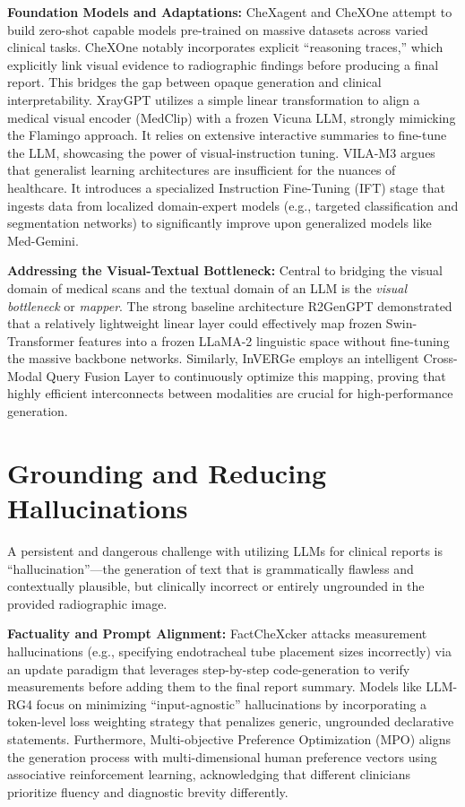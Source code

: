 \documentclass[11pt]{article}
\begin{document}
\textbf{Foundation Models and Adaptations:}
CheXagent \cite{chen2024chexagent} and CheXOne \cite{zhou2026chexone} attempt to build zero-shot capable models pre-trained on massive datasets across varied clinical tasks. CheXOne notably incorporates explicit ``reasoning traces,'' which explicitly link visual evidence to radiographic findings before producing a final report. This bridges the gap between opaque generation and clinical interpretability. XrayGPT \cite{thawkar2024xraygpt} utilizes a simple linear transformation to align a medical visual encoder (MedClip) with a frozen Vicuna LLM, strongly mimicking the Flamingo approach. It relies on extensive interactive summaries to fine-tune the LLM, showcasing the power of visual-instruction tuning. VILA-M3 \cite{vila2025vilam3} argues that generalist learning architectures are insufficient for the nuances of healthcare. It introduces a specialized Instruction Fine-Tuning (IFT) stage that ingests data from localized domain-expert models (e.g., targeted classification and segmentation networks) to significantly improve upon generalized models like Med-Gemini.

\textbf{Addressing the Visual-Textual Bottleneck:}
Central to bridging the visual domain of medical scans and the textual domain of an LLM is the \textit{visual bottleneck} or \textit{mapper}. The strong baseline architecture R2GenGPT \cite{wang2023r2gengpt} demonstrated that a relatively lightweight linear layer could effectively map frozen Swin-Transformer features into a frozen LLaMA-2 linguistic space without fine-tuning the massive backbone networks. Similarly, InVERGe \cite{roy2024inverge} employs an intelligent Cross-Modal Query Fusion Layer to continuously optimize this mapping, proving that highly efficient interconnects between modalities are crucial for high-performance generation. 

\section{Grounding and Reducing Hallucinations}

A persistent and dangerous challenge with utilizing LLMs for clinical reports is ``hallucination''---the generation of text that is grammatically flawless and contextually plausible, but clinically incorrect or entirely ungrounded in the provided radiographic image.

\textbf{Factuality and Prompt Alignment:}
FactCheXcker \cite{factchexcker2025} attacks measurement hallucinations (e.g., specifying endotracheal tube placement sizes incorrectly) via an update paradigm that leverages step-by-step code-generation to verify measurements before adding them to the final report summary. Models like LLM-RG4 \cite{wang2025llmrg4} focus on minimizing ``input-agnostic'' hallucinations by incorporating a token-level loss weighting strategy that penalizes generic, ungrounded declarative statements. Furthermore, Multi-objective Preference Optimization (MPO) \cite{xiao2025mpo} aligns the generation process with multi-dimensional human preference vectors using associative reinforcement learning, acknowledging that different clinicians prioritize fluency and diagnostic brevity differently.
\end{document}
